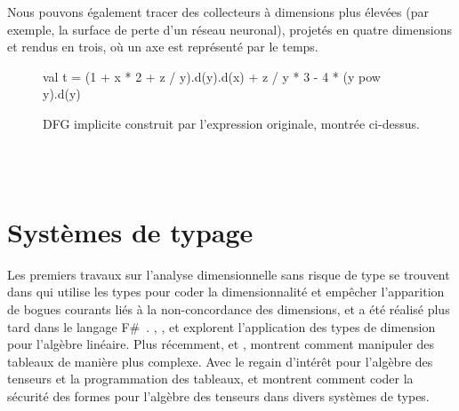 Nous pouvons également tracer des collecteurs à dimensions plus élevées (par exemple, la surface de perte d'un réseau neuronal), projetés en quatre dimensions et rendus en trois, où un axe est représenté par le temps.
%
\begin{figure}
    \begin{unbreakablekotlin}
        val t = (1 + x * 2 + z / y).d(y).d(x) + z / y * 3 - 4 * (y pow y).d(y)
    \end{unbreakablekotlin}
\end{figure}
\vspace{-40pt}
\begin{figure}
    \centering
    
    \caption{DFG implicite construit par l'expression originale, montrée ci-dessus.}
    \label{lst:edsl}
\end{figure}\\\\

\section{Systèmes de typage}\label{sec:type-systems}

Les premiers travaux sur l'analyse dimensionnelle sans risque de type se trouvent dans \citet{kennedy1994dimension, kennedy1996programming} qui utilise les types pour coder la dimensionnalité et empêcher l'apparition de bogues courants liés à la non-concordance des dimensions, et a été réalisé plus tard dans le langage F\#~\citep{kennedy2010types}. \citet{jay1996shape}, \citet{rittri1995dimension}, et \citet{zenger1997indexed} explorent l'application des types de dimension pour l'algèbre linéaire. Plus récemment, \citet{kiselyov2005number, kiselyov2010fun} et \citet{griffioen2015type}, montrent comment manipuler des tableaux de manière plus complexe. Avec le regain d'intérêt pour l'algèbre des tenseurs et la programmation des tableaux, \citet{chen2017typesafe} et \citet{rink2018modeling} montrent comment coder la sécurité des formes pour l'algèbre des tenseurs dans divers systèmes de types.

